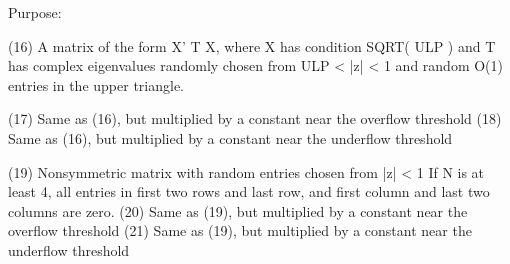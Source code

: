 \begin{DoxyParagraph}{Purpose\+: }
\begin{DoxyVerb}
    (16) A matrix of the form  X' T X, where X has condition
         SQRT( ULP ) and T has complex eigenvalues randomly chosen
         from ULP < |z| < 1 and random O(1) entries in the upper
         triangle.

    (17) Same as (16), but multiplied by a constant
         near the overflow threshold
    (18) Same as (16), but multiplied by a constant
         near the underflow threshold

    (19) Nonsymmetric matrix with random entries chosen from |z| < 1
         If N is at least 4, all entries in first two rows and last
         row, and first column and last two columns are zero.
    (20) Same as (19), but multiplied by a constant
         near the overflow threshold
    (21) Same as (19), but multiplied by a constant
         near the underflow threshold\end{DoxyVerb}
 
\end{DoxyParagraph}

